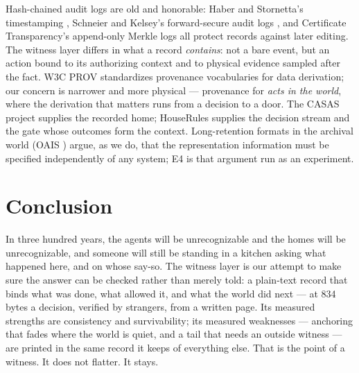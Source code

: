 \documentclass[journal]{IEEEtran}
\begin{document}
Hash-chained audit logs are old and honorable: Haber and Stornetta's
timestamping \cite{haber}, Schneier and Kelsey's forward-secure audit
logs \cite{schneier}, and Certificate Transparency's append-only Merkle
logs \cite{rfc6962} all protect records against later editing. The
witness layer differs in what a record \emph{contains}: not a bare
event, but an action bound to its authorizing context and to physical
evidence sampled after the fact. W3C PROV \cite{prov} standardizes
provenance vocabularies for data derivation; our concern is narrower
and more physical --- provenance for \emph{acts in the world}, where
the derivation that matters runs from a decision to a door. The CASAS
project \cite{casas} supplies the recorded home; HouseRules
\cite{hourules} supplies the decision stream and the gate whose
outcomes form the context. Long-retention formats in the archival
world (OAIS \cite{oais}) argue, as we do, that the representation
information must be specified independently of any system; E4 is that
argument run as an experiment.

\section{Conclusion}

In three hundred years, the agents will be unrecognizable and the
homes will be unrecognizable, and someone will still be standing in a
kitchen asking what happened here, and on whose say-so. The witness
layer is our attempt to make sure the answer can be checked rather
than merely told: a plain-text record that binds what was done, what
allowed it, and what the world did next --- at 834 bytes a decision,
verified by strangers, from a written page. Its measured strengths
are consistency and survivability; its measured weaknesses ---
anchoring that fades where the world is quiet, and a tail that needs
an outside witness --- are printed in the same record it keeps of
everything else. That is the point of a witness. It does not flatter.
It stays.
\end{document}
